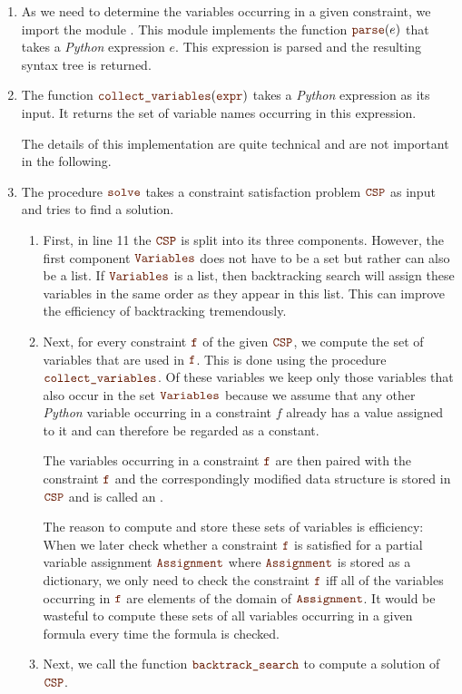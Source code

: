 \begin{enumerate}
\item As we need to determine the variables occurring in a given constraint, we import the module
      .  This module implements the function $\mytt{parse}(e)$ that takes
      a \textsl{Python} expression $e$.  This expression is parsed and the resulting syntax tree is returned.
\item The function $\mytt{collect\_variables}(\mytt{expr})$ takes a \textsl{Python} expression as its input.
      It returns the set of variable names occurring in this expression.

      The details of this implementation are quite technical and are not important in the following.
\item The procedure $\mytt{solve}$ takes a constraint satisfaction problem $\mytt{CSP}$ as input and tries
      to find a solution.    
      \begin{enumerate}
      \item First, in line 11 the $\mytt{CSP}$ is split into its three components.  However, the first
            component $\mytt{Variables}$ does not have to be a set but rather can also be a list.
            If $\mytt{Variables}$ is a list, then backtracking search will assign these variables 
            in the same order as they appear in this list.  This can improve the efficiency of backtracking
            tremendously. 
      \item Next, for every constraint $\mytt{f}$ of the given $\mytt{CSP}$, we compute the set of variables that
            are used in $\mytt{f}$.  This is done using the procedure $\mytt{collect\_variables}$.
            Of these variables we keep only those variables that also occur in the set $\mytt{Variables}$
            because we assume that any other \textsl{Python} variable occurring in a constraint $f$ already has
            a value assigned to it and can therefore be regarded as a constant.

            The variables occurring in a constraint $\mytt{f}$ are then paired with the constraint $\mytt{f}$ and
            the correspondingly modified data structure is stored in $\mytt{CSP}$ and is called an
            .

            The reason to compute and store these sets of variables is efficiency: When we later check whether
            a constraint $\mytt{f}$ is satisfied for a partial variable assignment $\mytt{Assignment}$ where $\mytt{Assignment}$ is
            stored as a dictionary, we only need to check the constraint $\mytt{f}$ iff all of the variables occurring
            in $\mytt{f}$ are elements of the domain of $\mytt{Assignment}$.   It would be wasteful to compute
            these sets of all variables occurring in a given formula every time the formula is checked.
      \item Next, we call the function $\mytt{backtrack\_search}$ to compute a solution of $\mytt{CSP}$.
   \end{enumerate}
 \end{enumerate}

